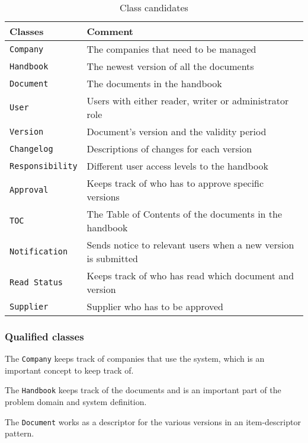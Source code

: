 \begin{table} [H]
	\centering
\begin{tabular}{l l}
	\hline
	Classes & Comment\\
	\hline
	\texttt{Company} & The companies that need to be managed \\
	\texttt{Handbook} & The newest version of all the documents\\
	\texttt{Document} & The documents in the handbook\\
	\texttt{User}& Users with either reader, writer or administrator role\\
	\texttt{Version} & Document’s version and the validity period\\
	\texttt{Changelog} & Descriptions of changes for each version\\
	\texttt{Responsibility} & Different user access levels to the handbook\\
	\texttt{Approval} & Keeps track of who has to approve specific
	versions\\
	\texttt{TOC} & The Table of Contents of the documents in the handbook\\
	\texttt{Notification} & Sends notice to relevant users when a new version is submitted\\
	\texttt{Read Status} & Keeps track of who has read which document and version\\
	\texttt{Supplier} & Supplier who has to be approved \\
	\hline
\end{tabular}
\caption{Class candidates}\label{tab:ClassCandidates}
\end{table}

\subsubsection*{Qualified classes}

The \texttt{Company} keeps track of companies that use the system, which is an important concept to keep track of.

The \texttt{Handbook} keeps track of the documents and is an important part of the problem domain and system definition.

The \texttt{Document} works as a descriptor for the various versions in an item-descriptor pattern.

